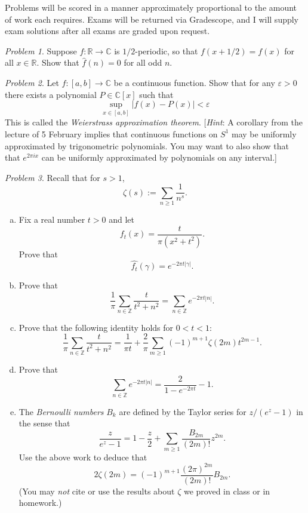 \documentclass[11pt,twoside]{amsart}
\theoremstyle{plain}
\theoremstyle{remark}
\newtheorem{prob}{Problem}
\theoremstyle{definition}
\theoremstyle{definition}
\newcommand{\RR}{\mathbb{R}}
\newcommand{\ZZ}{\mathbb{Z}}
\newcommand{\CC}{\mathbb{C}}
\begin{document}
\bigskip
\noindent Problems will be scored in a manner approximately proportional to the amount of work each requires.  Exams will be returned via Gradescope, and I will supply exam solutions after all exams are graded upon request.

\bigskip

\begin{prob}
Suppose $f\colon \RR\to \CC$ is $1/2$-periodic, so that $f(x+1/2) = f(x)$ for all $x\in \RR$. Show that $\hat f(n) = 0$ for all odd $n$.
\end{prob}

\begin{prob}
Let $f\colon [a,b]\to \CC$ be a continuous function. Show that for any $\varepsilon>0$ there exists a polynomial $P\in \CC[x]$ such that
\[
  \sup_{x\in [a,b]}|f(x)-P(x)|<\varepsilon
\]
This is called the \emph{Weierstrass approximation theorem}. [\emph{Hint}: A corollary from the lecture of 5 February implies that continuous functions on $S^1$ may be uniformly approximated by trigonometric polynomials. You may want to also show that that $e^{2\pi ix}$ can be uniformly approximated by polynomials on any interval.]
\end{prob}

\begin{prob}
Recall that for $s>1$,
\[
  \zeta(s) := \sum_{n\ge 1} \frac{1}{n^s}.
\]
\begin{enumerate}[(a)]
\item Fix a real number $t>0$ and let
\[
  f_t(x) = \frac{t}{\pi(x^2+t^2)}.
\]
Prove that
\[
  \widehat{f_t}(\gamma) = e^{-2\pi t|\gamma|}.
\]
\item Prove that
\[
  \frac 1\pi \sum_{n\in \ZZ} \frac{t}{t^2+n^2} = \sum_{n\in \ZZ} e^{-2\pi t|n|}.
\]
\item Prove that the following identity holds for $0<t<1$:
\[
  \frac 1\pi \sum_{n\in \ZZ}\frac{t}{t^2+n^2} = \frac{1}{\pi t} + \frac{2}{\pi}\sum_{m\ge 1} (-1)^{m+1}\zeta(2m)t^{2m-1}.
\]
\item Prove that
\[
  \sum_{n\in \ZZ}e^{-2\pi t|n|} = \frac{2}{1-e^{-2\pi t}}-1.
\]
\item The \emph{Bernoulli numbers} $B_k$ are defined by the Taylor series for $z/(e^z-1)$ in the sense that
\[
  \frac{z}{e^z-1} = 1-\frac z2 + \sum_{m\ge 1}\frac{B_{2m}}{(2m)!}z^{2m}.
\]
Use the above work to deduce that
\[
  2\zeta(2m) = (-1)^{m+1}\frac{(2\pi)^{2m}}{(2m)!}B_{2m}.
\]
(You may \emph{not} cite or use the results about $\zeta$ we proved in class or in homework.)
\end{enumerate}
\end{prob}
\end{document}
